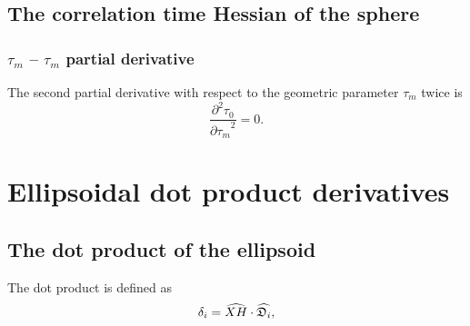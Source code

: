 
\subsection{The correlation time Hessian of the sphere}


\subsubsection{$\tau_m$ -- $\tau_m$ partial derivative}

The second partial derivative with respect to the geometric parameter $\tau_m$ twice is
\begin{equation}
    \frac{\partial^2 \tau_{0}}{{\partial \tau_m}^2} = 0.
\end{equation}





\newpage
\section{Ellipsoidal dot product derivatives}




\subsection{The dot product of the ellipsoid}

The dot product is defined as
\begin{equation}
    \delta_i = \widehat{XH} \cdot \widehat{\mathfrak{D}_i},
\end{equation}


